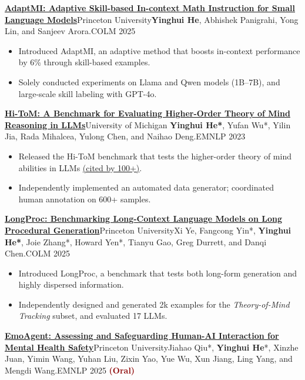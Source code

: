 \documentclass[a4paper,11pt]{article}
\begin{document}
{\resumePublication
{\href{https://arxiv.org/abs/2505.00147}{\textbf{AdaptMI: Adaptive Skill-based In-context Math Instruction for Small Language Models}}}{Princeton University}{\textbf{Yinghui He}, Abhishek Panigrahi, Yong Lin, and Sanjeev Arora.}{COLM 2025}

\begin{itemize}[leftmargin=*, itemsep=0.2mm]
  \item Introduced AdaptMI, an adaptive method that boosts in-context performance by 6\% through skill-based examples.
  \item Solely conducted experiments on Llama and Qwen models (1B--7B), and large-scale skill labeling with GPT-4o.
\end{itemize}


\resumePublication
{\href{https://arxiv.org/abs/2310.16755}{\textbf{Hi-ToM: A Benchmark for Evaluating Higher-Order Theory of Mind Reasoning in LLMs}}}{University of Michigan}{
\textbf{Yinghui He*}, Yufan Wu*, Yilin Jia, Rada Mihalcea, Yulong Chen, and Naihao Deng.}{EMNLP 2023}

\begin{itemize}[leftmargin=*, itemsep=0.2mm]
  \item Released the Hi-ToM benchmark that tests the higher-order theory of mind abilities in LLMs \href{https://scholar.google.com/citations?view_op=view_citation&hl=en&user=HGVRBCoAAAAJ&citation_for_view=HGVRBCoAAAAJ:u5HHmVD_uO8C}{(cited by 100+)}.
  \item Independently implemented an automated data generator; coordinated human annotation on 600+ samples.
\end{itemize}


\resumePublication
{\href{https://arxiv.org/abs/2501.05414}{\textbf{LongProc: Benchmarking Long-Context Language Models on Long Procedural Generation}}}{Princeton University}{Xi Ye, Fangcong Yin*, \textbf{Yinghui He*}, Joie Zhang*, Howard Yen*, Tianyu Gao, Greg Durrett, and Danqi Chen.}{COLM 2025}

\begin{itemize}[leftmargin=*, itemsep=0.2mm]
  \item Introduced LongProc, a benchmark that tests both long-form generation and highly dispersed information.
  \item Independently designed and generated 2k examples for the \textit{Theory-of-Mind Tracking} subset, and evaluated 17 LLMs.
\end{itemize}

\resumePublication
{\href{https://arxiv.org/abs/2504.09689}{\textbf{EmoAgent: Assessing and Safeguarding Human-AI Interaction for Mental Health Safety}}}{Princeton University}{Jiahao Qiu*, \textbf{Yinghui He}*, Xinzhe Juan, Yimin Wang, Yuhan Liu, Zixin Yao, Yue Wu, Xun Jiang, Ling Yang, and Mengdi Wang.}{EMNLP 2025 \textcolor{darkred}{\textbf{(Oral)}}}

}
\end{document}
